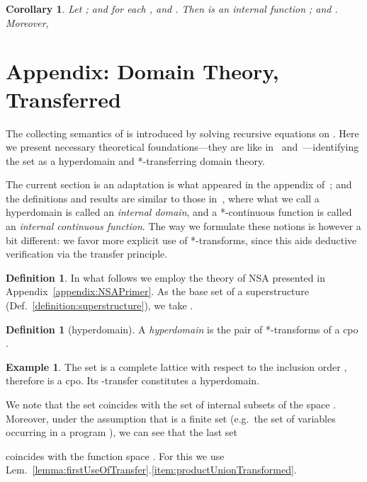 \documentclass[envcountsect,orivec]{llncs} \pdfoutput=1
\newtheorem{mycor}[mythm]{Corollary}
\theoremstyle{definition}
\newtheorem{myexpl}[mythm]{Example}
\newtheorem{mydef}[mythm]{Definition}
\begin{document}
\begin{mycor}\label{corollary:MFuncMArg}
Let ; and for each ,  and
 . Then  is an internal function
	; and . Moreover, 
 
\end{mycor}

\section{Appendix: Domain Theory, Transferred}\label{appendix:domainTheoryTransferred}
The collecting semantics of  is introduced by solving recursive equations on .
Here we present
necessary theoretical foundations---they are  like
in~\cite[\S{}2.2]{BeauxisM11} and~\cite{Suenaga2013}---identifying the
set  as a hyperdomain and *-transferring domain theory.

 The current section is an adaptation is what appeared in the appendix
 of~\cite{Suenaga2013}; and 
 the definitions and results  are similar to those
 in~\cite[\S{}2.2]{BeauxisM11}, where what we call a hyperdomain is
 called an \emph{internal domain}, and a *-continuous function is called
 an
 \emph{internal continuous function}. The way we formulate these notions
 is however a bit different: we favor more explicit use of *-transforms, since
 this aids deductive verification via the transfer principle.



\begin{mydef}\label{definition:baseSetOfCurrentPaper}
 In what follows we employ the theory of NSA presented
 in Appendix~\ref{appendix:NSAPrimer}. As
 the base set of a superstructure 
 (Def.~\ref{definition:superstructure}), we take
 .
\end{mydef}







\begin{mydef}[hyperdomain]\label{definition:hyperdomain}
 A \emph{hyperdomain} is  the pair of *-transforms
  of a cpo . 
\end{mydef}
\begin{myexpl}\label{ex:hyperdomainInCurrentWork}
 The set  is a complete lattice with respect to the
 inclusion order , therefore is a cpo. Its -transfer 
  constitutes a hyperdomain. 

We note that the set  coincides
 with the set of internal subsets of the space .
 Moreover, under the assumption that  is a finite set (e.g.\ the
 set of variables occurring in a program ), we can see that the last
 set

 coincides with the function space . For this we use 
Lem.~\ref{lemma:firstUseOfTransfer}.\ref{item:productUnionTransformed}.
\end{myexpl}
\end{document}

